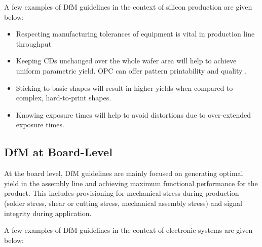 A few examples of \ac{DfM} guidelines in the context of silicon production
are given below:

\begin{itemize}[topsep=8pt,itemsep=4pt,partopsep=4pt, parsep=4pt]

    \item Respecting manufacturing tolerances of equipment is vital in
    production line throughput

    \item Keeping \acp{CD} unchanged over the whole wafer area will help
    to achieve uniform parametric yield.
    \ac{OPC} can offer pattern printability and
    quality \autocite{5755022}.

    \item Sticking to basic shapes will result in higher yields when
    compared to complex, hard-to-print shapes.

    \item Knowing exposure times will help to avoid distortions due to
    over-extended exposure times.

\end{itemize}

\subsection{\ac{DfM} at Board-Level}
\label{subsec:dfm-pcb}

At the board level, \ac{DfM} guidelines are mainly focused on generating optimal
yield in the assembly line and achieving maximum functional performance for the
product.
This includes provisioning for mechanical stress during production (solder
stress, shear or cutting stress, mechanical assembly stress) and signal
integrity during application.

A few examples of \ac{DfM} guidelines in the context of electronic systems are
given below:

